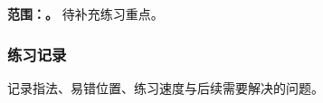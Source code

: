 \textbf{范围：\CurrentSegmentRange。} 待补充练习重点。
\SegmentScore

\subsubsection*{练习记录}
记录指法、易错位置、练习速度与后续需要解决的问题。
